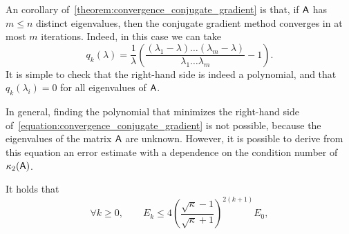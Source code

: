 An corollary of~\cref{theorem:convergence_conjugate_gradient} is that,
if $\mathsf A$ has $m \leq n$ distinct eigenvalues,
then the conjugate gradient method converges in at most $m$ iterations.
Indeed, in this case we can take
\[
    q_k(\lambda) = \frac{1}{\lambda} \left( \frac{(\lambda_1 - \lambda) \dotsc (\lambda_m - \lambda)}{\lambda_1 \dotsc \lambda_m} - 1 \right).
\]
It is simple to check that the right-hand side is indeed a polynomial,
and that $q_k(\lambda_i) = 0$ for all eigenvalues of $\mathsf A$.

In general, finding the polynomial that minimizes the right-hand side of~\eqref{equation:convergence_conjugate_gradient} is not possible,
because the eigenvalues of the matrix $\mathsf A$ are unknown.
However, it is possible to derive from this equation an error estimate with a dependence on the condition number of $\kappa_2(\mathsf A)$.
\begin{theorem}
    It holds that
    \[
        \forall k \geq 0, \qquad
        E_{k} \leq  4 \left( \frac{\sqrt{\kappa} - 1}{\sqrt{\kappa} + 1} \right)^{2(k+1)} E_0,
    \]
\end{theorem}
